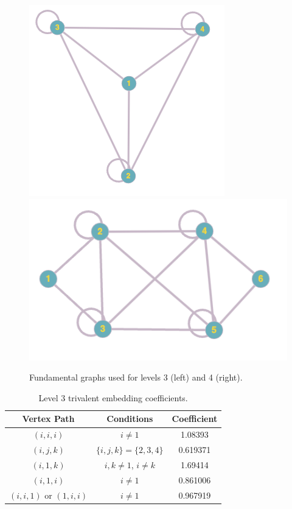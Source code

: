 \begin{figure}
    \centering
    \includegraphics[width=0.35\linewidth]{figs/graphs/graph_A.png}
    \includegraphics[width=0.425\linewidth]{figs/graphs/graph_B.png}
    \caption{Fundamental graphs used for levels 3 (left) and 4 (right).}
    \label{fig:graphs}
\end{figure}


\begin{table}
    \centering
    \begin{tabular}{|cc|c|} \hline
        Vertex Path & Conditions & Coefficient \\ \hline\hline
        $(i,i,i)$ &  $i\neq1$ & 1.08393 \\[10pt]  \hline
        $(i,j,k)$ &  $\{i,j,k\}=\{2,3,4\}$   & 0.619371 \\[10pt] \hline
        $(i,1,k)$ &  $i,k\neq 1$, $i\neq k$ & 1.69414 \\[10pt] \hline
        $(i,1,i)$ &  $i\neq 1$   & 0.861006 \\[10pt] \hline
        $(i,i,1)$ or $(1,i,i)$ &  $i\neq1$   & 0.967919 \\[10pt] \hline
    \end{tabular}
    \caption{Level 3 trivalent embedding coefficients.}
    \label{tab:lvl-3-triv-coefs}
\end{table}






